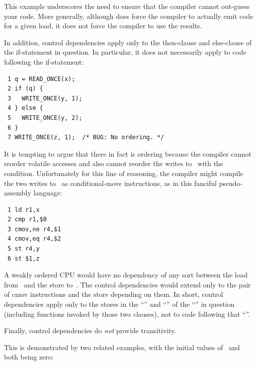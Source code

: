 \begin{enumerate}
This example underscores the need to ensure that the compiler cannot
out-guess your code.
More generally, although  does force
the compiler to actually emit code for a given load, it does not force
the compiler to use the results.

In addition, control dependencies apply only to the then-clause and
else-clause of the if-statement in question.
In particular, it does
not necessarily apply to code following the if-statement:

\vspace{5pt}
\begin{minipage}[t]{\columnwidth}
\scriptsize
\begin{verbatim}
 1 q = READ_ONCE(x);
 2 if (q) {
 3   WRITE_ONCE(y, 1);
 4 } else {
 5   WRITE_ONCE(y, 2);
 6 }
 7 WRITE_ONCE(z, 1);  /* BUG: No ordering. */
\end{verbatim}
\end{minipage}
\vspace{5pt}

It is tempting to argue that there in fact is ordering because the
compiler cannot reorder volatile accesses and also cannot reorder
the writes to~ with the condition.
Unfortunately for this line
of reasoning, the compiler might compile the two writes to~ as
conditional-move instructions, as in this fanciful pseudo-assembly
language:

\vspace{5pt}
\begin{minipage}[t]{\columnwidth}
\scriptsize
\begin{verbatim}
 1 ld r1,x
 2 cmp r1,$0
 3 cmov,ne r4,$1
 4 cmov,eq r4,$2
 5 st r4,y
 6 st $1,z
\end{verbatim}
\end{minipage}
\vspace{5pt}

A weakly ordered CPU would have no dependency of any sort between the load
from~ and the store to~.
The control dependencies would extend
only to the pair of cmov instructions and the store depending on them.
In short, control dependencies apply only to the stores in the ``''
and ``'' of the ``'' in question (including functions
invoked by those two clauses), not to code following that ``''.

Finally, control dependencies do \emph{not} provide transitivity.

This is demonstrated by two related examples, with the initial values
of~ and~ both being zero:


\end{enumerate}
